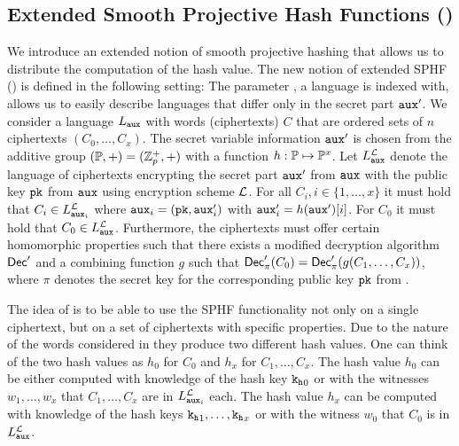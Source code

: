 \subsection[Extended Smooth Projective Hash Functions (SPHFx)]{Extended Smooth Projective Hash Functions (\SPHFF)}\label{sec:sphff}
We introduce an extended notion of smooth projective hashing that allows us to distribute the computation of the hash value.
The new notion of extended SPHF (\SPHFF) is defined in the following setting:
The parameter \aux, a language is indexed with, allows us to easily describe languages that differ only in the secret part $\mathtt{aux}'$.
We consider a language $L_\mathtt{aux}$ with words (ciphertexts) $C$ that are ordered sets of $n$ ciphertexts $(C_0,\dots,C_x)$.
The secret variable information $\mathtt{aux}'$ is chosen from the additive group $(\mathbb{P},+)=(\mathbb{Z}_p^{+},+)$ with a function $h:\mathbb{P}\mapsto\mathbb{P}^x$.
Let $L^\mathcal{L}_\mathtt{aux}$ denote the language of ciphertexts encrypting the secret part $\mathtt{aux}'$ from $\mathtt{aux}$ with the public key $\mathtt{pk}$ from $\mathtt{aux}$ using encryption scheme $\mathcal{L}$.
For all $C_i, i\in\{1,\dots,x\}$ it must hold that $C_i\in L^\mathcal{L}_{\mathtt{aux}_i}$ where $\mathtt{aux}_i=(\mathtt{pk},\mathtt{aux}'_i)$ with $\mathtt{aux}'_i=h(\mathtt{aux}')[i]$.
For $C_0$ it must hold that $C_0\in L^\mathcal{L}_{\mathtt{aux}}$.
Furthermore, the ciphertexts must offer certain homomorphic properties such that there exists a modified decryption algorithm $\mathsf{Dec}'$ and a combining function $g$ such that $\mathsf{Dec}'_{\pi}(C_0)=\mathsf{Dec}'_{\pi}(g(C_1,\dots,C_x))$, where $\pi$ denotes the secret key for the corresponding public key $\mathtt{pk}$ from \crs.

The idea of \SPHFF is to be able to use the SPHF functionality not only on a single ciphertext, but on a set of ciphertexts with specific properties.
Due to the nature of the words considered in \SPHFF they produce two different hash values.
One can think of the two hash values as $h_0$ for $C_0$ and  $h_x$ for $C_1,\dots,C_x$.
The hash value $h_0$ can be either computed with knowledge of the hash key $\mathtt{k_h}_0$ or with the witnesses $w_1,\dots,w_x$ that $C_1,\dots,C_x$ are in $L^\mathcal{L}_{\mathtt{aux}_i}$ each.
The hash value $h_x$ can be computed with knowledge of the hash keys $\mathtt{k_h}_1,\dots,\mathtt{k_h}_x$ or with the witness $w_0$ that $C_0$ is in $L^\mathcal{L}_{\mathtt{aux}}$.

